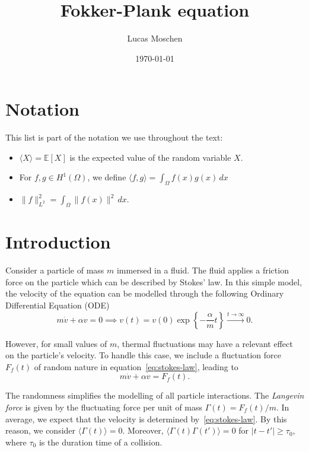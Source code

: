 \documentclass[12pt]{article}
\title{Fokker-Plank equation}
\author{Lucas Moschen}
\date{\today}
\theoremstyle{definition}
\begin{document}
\maketitle

\onehalfspacing{}
    
\tableofcontents

\section*{Notation}

This list is part of the notation we use throughout the text:

\begin{itemize}
    \item $\langle X \rangle = \mathbb{E}[X]$ is the expected value of the random variable $X$.
    \item For $f, g \in H^1(\Omega)$, we define $\langle f, g \rangle = \int_{\Omega} f(x) g(x) \, dx$
    \item $\|f\|_{L^2}^2 = \int_{\Omega} \|f(x)\|^2 \, dx$.
\end{itemize}

\section{Introduction}

Consider a particle of mass $m$ immersed in a fluid.
The fluid applies a friction force on the particle which can be described by Stokes' law.
In this simple model, the velocity of the equation can be modelled through the following Ordinary Differential Equation (ODE)
\begin{equation}
    \label{eq:stokes-law}
    m \dot{v} + \alpha v = 0 \implies v(t) = v(0) \exp\left\{-\frac{\alpha}{m} t\right\} \overset{t \to \infty}{\to} 0.    
\end{equation}

However, for small values of $m$, thermal fluctuations may have a relevant effect on the particle's velocity.
To handle this case, we include a fluctuation force $F_f(t)$ of random nature in equation~\eqref{eq:stokes-law}, leading to 
\begin{equation}
    \label{eq:fluctuation-force}
    m\dot{v} + \alpha v = F_f(t).        
\end{equation}

The randomness simplifies the modelling of all particle interactions.
The {\em Langevin force\/} is given by the fluctuating force per unit of mass $\Gamma(t) = F_f(t)/m$.
In average, we expect that the velocity is determined by~\eqref{eq:stokes-law}. 
By this reason, we consider $\langle \Gamma(t) \rangle = 0$.
Moreover, $\langle \Gamma(t) \Gamma(t') \rangle = 0$ for $|t-t'| \ge \tau_0$, where $\tau_0$ is the duration time of a collision.
\end{document}
